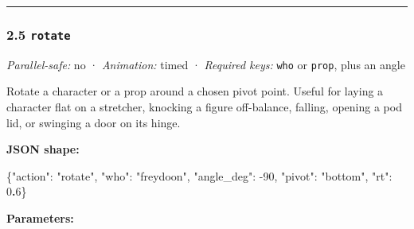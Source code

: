 \documentclass[
  11pt,
]{book}
\newenvironment{Shaded}{}{}
\newcommand{\DataTypeTok}[1]{\textcolor[rgb]{0.56,0.13,0.00}{#1}}
\newcommand{\DecValTok}[1]{\textcolor[rgb]{0.25,0.63,0.44}{#1}}
\newcommand{\ErrorTok}[1]{\textcolor[rgb]{1.00,0.00,0.00}{\textbf{#1}}}
\newcommand{\FunctionTok}[1]{\textcolor[rgb]{0.02,0.16,0.49}{#1}}
\newcommand{\StringTok}[1]{\textcolor[rgb]{0.25,0.44,0.63}{#1}}
\begin{document}
\begin{center}\rule{0.5\linewidth}{0.5pt}\end{center}

\subsubsection{\texorpdfstring{2.5
\texttt{rotate}}{2.5 rotate}}\label{rotate}

\emph{Parallel-safe:} no · \emph{Animation:} timed · \emph{Required
keys:} \texttt{who} or \texttt{prop}, plus an angle

Rotate a character or a prop around a chosen pivot point. Useful for
laying a character flat on a stretcher, knocking a figure off-balance,
falling, opening a pod lid, or swinging a door on its hinge.

\textbf{JSON shape:}

\begin{Shaded}
\begin{Highlighting}[]
\FunctionTok{\{}\DataTypeTok{"action"}\FunctionTok{:} \StringTok{"rotate"}\FunctionTok{,} \DataTypeTok{"who"}\FunctionTok{:} \StringTok{"freydoon"}\FunctionTok{,}
 \DataTypeTok{"angle\_deg"}\FunctionTok{:} \DecValTok{{-}90}\FunctionTok{,} \DataTypeTok{"pivot"}\FunctionTok{:} \StringTok{"bottom"}\FunctionTok{,} \DataTypeTok{"rt"}\FunctionTok{:} \DecValTok{0}\ErrorTok{.}\DecValTok{6}\FunctionTok{\}}
\end{Highlighting}
\end{Shaded}

\textbf{Parameters:}
\end{document}
